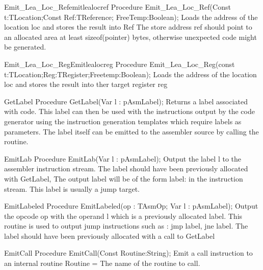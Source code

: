 \documentclass [a4paper,12pt]{article}
\begin{document}
\begin{functionl}{Emit{\_}Lea{\_}Loc{\_}Ref}{emitlealocref}
\Declaration
Procedure Emit{\_}Lea{\_}Loc{\_}Ref(Const t:TLocation;Const Ref:TReference; FreeTemp:Boolean);
\Description
Loads the address of the location \textsf{loc }and stores the result into
\textsf{Ref}
\Notes
The store address \textsf{ref }should point to an allocated area at least
\textsf{sizeof(pointer)} bytes, otherwise unexpected code might be
generated.
\end{functionl}

\begin{functionl}{Emit{\_}Lea{\_}Loc{\_}Reg}{Emitlealocreg}
\Declaration
Procedure Emit{\_}Lea{\_}Loc{\_}Reg(const t:TLocation;Reg:TRegister;Freetemp:Boolean);
\Description
Loads the address of the location \textsf{loc }and stores the result into
ther target register \textsf{reg}
\end{functionl}

\begin{procedure}{GetLabel}
\Declaration
Procedure GetLabel(Var l : pAsmLabel);
\Description
Returns a label associated with code. This label can then be used with the
instructions output by the code generator using the instruction generation
templates which require labels as parameters. The label itself can be
emitted to the assembler source by calling the  routine.
\end{procedure}

\begin{procedure}{EmitLab}
\Declaration
Procedure EmitLab(Var l : pAsmLabel);
\Description
Output the label \textsf{l} to the assembler instruction stream.
\Notes
The label should have been previously allocated with \textsf{GetLabel}, The
output label will be of the form label: in the instruction stream. This
label is usually a jump target.
\end{procedure}

\begin{procedure}{EmitLabeled}
\Declaration
Procedure EmitLabeled(op : TAsmOp; Var l : pAsmLabel);
\Description
Output the opcode \textsf{op} with the operand \textsf{l}
which is a previously allocated label.
\Notes
This routine is used to output jump instructions such as : jmp label, jne
label.  The label should have been previously allocated with a call to
\textsf{GetLabel}
\end{procedure}

\begin{function}{EmitCall}
\Declaration
Procedure EmitCall(Const Routine:String);
\Description
Emit a call instruction to an internal routine
\Parameters
Routine = The name of the routine to call.
\end{function}
\end{document}
